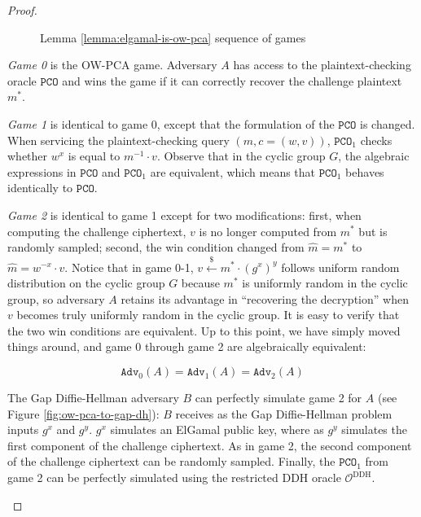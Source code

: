\documentclass[journal=tches,submission]{iacrtrans}
\newcommand{\pco}{\texttt{PCO}}
\newcommand{\leftsample}{\stackrel{\$}{\leftarrow}}
\newcommand{\adv}{\texttt{Adv}}
\begin{document}
\begin{proof}
\begin{figure}[h]
        \caption{Lemma \ref{lemma:elgamal-is-ow-pca} sequence of games}\label{fig:elgamal-pca-games}
    \end{figure}

    \emph{Game 0} is the OW-PCA game. Adversary $A$ has access to the plaintext-checking oracle $\pco$ and wins the game if it can correctly recover the challenge plaintext $m^\ast$.

    \emph{Game 1} is identical to game 0, except that the formulation of the $\pco$ is changed. When servicing the plaintext-checking query $(m, c = (w, v))$, $\pco_1$ checks whether $w^x$ is equal to $m^{-1} \cdot v$. Observe that in the cyclic group $G$, the algebraic expressions in $\pco$ and $\pco_1$ are equivalent, which means that $\pco_1$ behaves identically to $\pco$.

    \emph{Game 2} is identical to game 1 except for two modifications: first, when computing the challenge ciphertext, $v$ is no longer computed from $m^\ast$ but is randomly sampled; second, the win condition changed from $\hat{m} = m^\ast$ to $\hat{m} = w^{-x}\cdot v$. Notice that in game 0-1, $v \leftsample m^\ast \cdot (g^x)^y$ follows uniform random distribution on the cyclic group $G$ because $m^\ast$ is uniformly random in the cyclic group, so adversary $A$ retains its advantage in ``recovering the decryption'' when $v$ becomes truly uniformly random in the cyclic group. It is easy to verify that the two win conditions are equivalent. Up to this point, we have simply moved things around, and game 0 through game 2 are algebraically equivalent:

    \begin{equation*}
        \adv_0(A) = \adv_1(A) = \adv_2(A)
    \end{equation*}

    The Gap Diffie-Hellman adversary $B$ can perfectly simulate game 2 for $A$ (see Figure \ref{fig:ow-pca-to-gap-dh}): $B$ receives as the Gap Diffie-Hellman problem inputs $g^x$ and $g^y$. $g^x$ simulates an ElGamal public key, where as $g^y$ simulates the first component of the challenge ciphertext. As in game 2, the second component of the challenge ciphertext can be randomly sampled. Finally, the $\pco_1$ from game 2 can be perfectly simulated using the restricted DDH oracle $\mathcal{O}^\text{DDH}$.

    \begin{figure}[h]
        \centering


\end{figure}
\end{proof}
\end{document}
